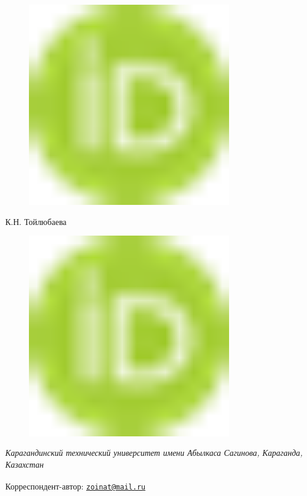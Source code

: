 {\begin{figure}[H]
	\centering
	\includegraphics[width=0.8\textwidth]{media/chem/image1}
	\caption*{}
\end{figure}

К.Н. Тойлюбаева}
\begin{figure}[H]
	\centering
	\includegraphics[width=0.8\textwidth]{media/chem/image1}
	\caption*{}
\end{figure}


\emph{Карагандинский технический университет имени Абылкаса Сагинова,
Караганда, Казахстан}

{\bfseries \textsuperscript{\envelope }}Корреспондент-автор:
\href{mailto:zoinat@mail.ru}{\nolinkurl{zoinat@mail.ru}}

